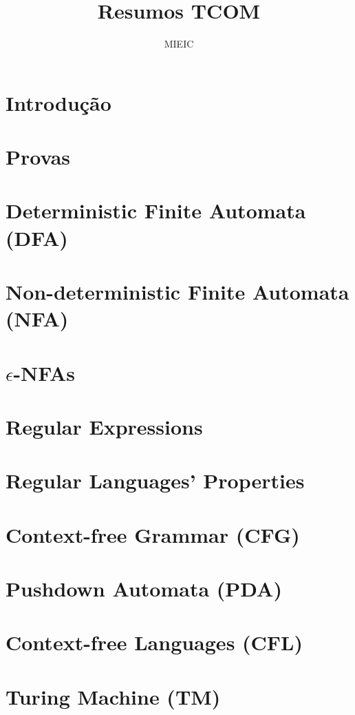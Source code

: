 \documentclass{article}
\title{Resumos TCOM}
\author{MIEIC}
\begin{document}
  
\maketitle

\tableofcontents

\section{Introdução}



\section{Provas}



\section{Deterministic Finite Automata (DFA)}



\section{Non-deterministic Finite Automata (NFA)}



\section{$\epsilon$-NFAs}



\section{Regular Expressions}



\section{Regular Languages' Properties}



\section{Context-free Grammar (CFG)}



\section{Pushdown Automata (PDA)}



\section{Context-free Languages (CFL)}



\section{Turing Machine (TM)}


\end{document}
